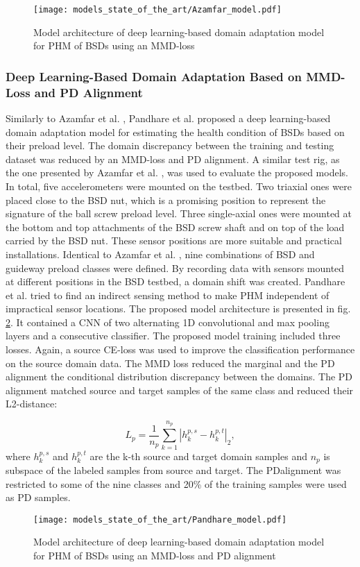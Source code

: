 \begin{figure}[H]
  \centering
  \texttt{[image: models\_state\_of\_the\_art/Azamfar\_model.pdf]}
  \caption{Model architecture of deep learning-based domain adaptation model for PHM of BSDs using an MMD-loss \cite{AZAMFAR2020103932}}
  \label{fig:Azamfar_model}
\end{figure}


\subsubsection{Deep Learning-Based Domain Adaptation Based on MMD-Loss and PD Alignment}
Similarly to Azamfar et al. \cite{AZAMFAR2020103932}, Pandhare et al. \cite{Pandhare2021} proposed a deep learning-based domain adaptation model for estimating the health condition of BSDs based on their preload level. The domain discrepancy between the training and testing dataset was reduced by an MMD-loss and PD alignment. A similar test rig, as the one presented by Azamfar et al. \cite{AZAMFAR2020103932}, was used to evaluate the proposed models. In total, five accelerometers were mounted on the testbed. Two triaxial ones were placed close to the BSD nut, which is a promising position to represent the signature of the ball screw preload level. Three single-axial ones were mounted at the bottom and top attachments of the BSD screw shaft and on top of the load carried by the BSD nut. These sensor positions are more suitable and practical installations. Identical to Azamfar et al. \cite{AZAMFAR2020103932}, nine combinations of BSD and guideway preload classes were defined. By recording data with sensors mounted at different positions in the BSD testbed, a domain shift was created. Pandhare et al. \cite{Pandhare2021} tried to find an indirect sensing method to make PHM independent of impractical sensor locations. The proposed model architecture is presented in fig. \ref{fig:Pandhare_model}. It contained a CNN of two alternating 1D convolutional and max pooling layers and a consecutive classifier. The proposed model training included three losses. Again, a source CE-loss was used to improve the classification performance on the source domain data. The MMD loss reduced the marginal and the PD alignment the conditional distribution discrepancy between the domains. The PD alignment matched source and target samples of the same class and reduced their L2-distance: 

\begin{equation}
    L_{p} = \frac{1}{n_{p}}\sum_{k=1}^{n_{p}}|h_{k}^{p,s}-h_{k}^{p,t}|_{2}, 
\end{equation}
where $h_{k}^{p,s}$ and $h_{k}^{p,t}$ are the k-th source and target domain samples and $n_{p}$ is subspace of the labeled samples from source and target. The PDalignment was restricted to some of the nine classes and 20\% of the training samples were used as PD samples.
\begin{figure}[H]
  \centering
  \texttt{[image: models\_state\_of\_the\_art/Pandhare\_model.pdf]}
  \caption{Model architecture of deep learning-based domain adaptation model for PHM of BSDs using an MMD-loss and PD alignment \cite{Pandhare2021}}
  \label{fig:Pandhare_model}
\end{figure}

